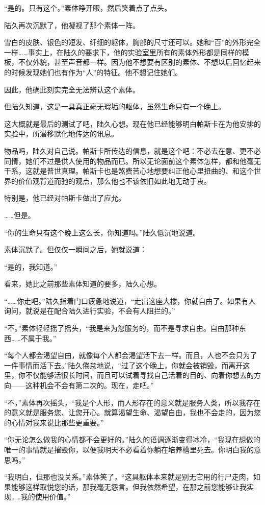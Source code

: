 “是的。只有这个。”素体睁开眼，然后笑着点了点头。

陆久再次沉默了，他凝视了那个素体一阵。

雪白的皮肤、银色的短发、纤细的躯体，胸部的尺寸还可以。她和“百”的外形完全一样……事实上，在陆久的要求下，他的实验室里所有的素体外形都是同样的模板，不仅外貌，甚至声音都一样。因为他不想要有区别的素体、不想以后回忆起来的时候发现她们也有作为“人”的特征。他不想记住她们。

因此，他确此刻实完全无法辨认这个素体。

但陆久知道，这是一具真正毫无瑕垢的躯体，虽然生命只有一个晚上。

这大概就是最后的测试了吧，陆久心想。现在他已经能够明白帕斯卡在为他安排的实验中，所潜移默化地传达的讯息。

物品吗，陆久对自己说。帕斯卡所传达的信息，就是这个吧：不必去在意、更不必同情，她们不过是供人使用的物品而已。所以无论面前这个素体怎样，都和他毫无干系，这就是普世真理。帕斯卡也是煞费苦心地想要纠正他心里扭曲的、和这个世界的价值观背道而驰的观点，那么他也不该依旧如此地无动于衷。

特别是，他已经对帕斯卡做出了应允。

……但是。

“你的生命只有这个晚上这么长，你知道吗。”陆久低沉地说道。

素体沉默了。但仅仅一瞬间之后，她就说道：

“是的，我知道。”

看来，她比之前那些素体知道的要多，陆久心想。

“……你走吧。”陆久指着门口疲惫地说道，“走出这座大楼，你就自由了。如果有人询问，就说是在配合陆久进行实验，不会有人阻拦的。”

“不。”素体轻轻摇了摇头，“我是来为您服务的，而不是寻求自由。自由那种东西……不属于我。”

“每个人都会渴望自由，就像每个人都会渴望活下去一样。而且，人也不会只为了一件事情而活下去。”陆久倦怠地说，“过了这个晚上，你就会被销毁，而离开这里，你不仅能够活很长时间，而且可以试着寻找自己活着的目的、向着你想去的方向——这种机会不会有第二次的。现在，走吧。”

“不，”素体再次摇头，“我是个人形，而人形存在的意义就是服务人类，所以我存在的意义就是服务您、让您开心。就算渴望生命、渴望自由，我也不会走的，因为您的心情对我来说比那些更重要。”

“你无论怎么做我的心情都不会更好的。”陆久的语调逐渐变得冰冷，“我现在想做的唯一的事情就是摧毁你，以便我明天不必看着你躺在培养槽里死去。你明白我的意思吗。”

“我明白，但那也没关系。”素体笑了，“这具躯体本来就是别无它用的行尸走肉，如果能够这样取悦您的话，那我毫无怨言。但我依然希望，在那之前您能够让我实现……我的使用价值。”

